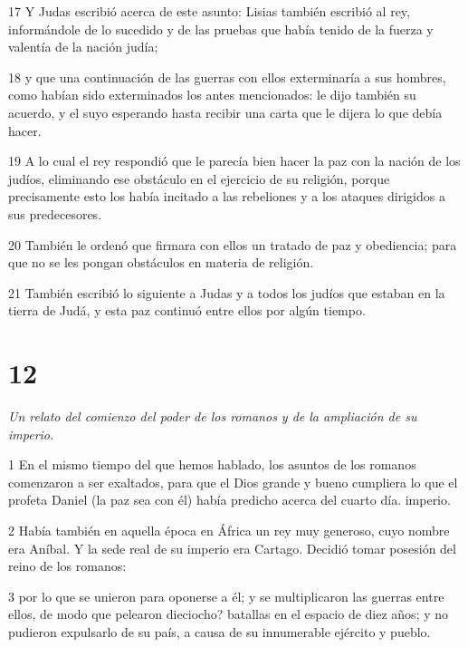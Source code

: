 \par 17 Y Judas escribió acerca de este asunto: Lisias también escribió al rey, informándole de lo sucedido y de las pruebas que había tenido de la fuerza y ​​valentía de la nación judía;

\par 18 y que una continuación de las guerras con ellos exterminaría a sus hombres, como habían sido exterminados los antes mencionados: le dijo también su acuerdo, y el suyo esperando hasta recibir una carta que le dijera lo que debía hacer.

\par 19 A lo cual el rey respondió que le parecía bien hacer la paz con la nación de los judíos, eliminando ese obstáculo en el ejercicio de su religión, porque precisamente esto los había incitado a las rebeliones y a los ataques dirigidos a sus predecesores.

\par 20 También le ordenó que firmara con ellos un tratado de paz y obediencia; para que no se les pongan obstáculos en materia de religión.

\par 21 También escribió lo siguiente a Judas y a todos los judíos que estaban en la tierra de Judá, y esta paz continuó entre ellos por algún tiempo.


\chapter{12}

\par \textit{Un relato del comienzo del poder de los romanos y de la ampliación de su imperio.}

\par 1 En el mismo tiempo del que hemos hablado, los asuntos de los romanos comenzaron a ser exaltados, para que el Dios grande y bueno cumpliera lo que el profeta Daniel (la paz sea con él) había predicho acerca del cuarto día. imperio.

\par 2 Había también en aquella época en África un rey muy generoso, cuyo nombre era Aníbal. Y la sede real de su imperio era Cartago. Decidió tomar posesión del reino de los romanos:

\par 3 por lo que se unieron para oponerse a él; y se multiplicaron las guerras entre ellos, de modo que pelearon dieciocho? batallas en el espacio de diez años; y no pudieron expulsarlo de su país, a causa de su innumerable ejército y pueblo.

